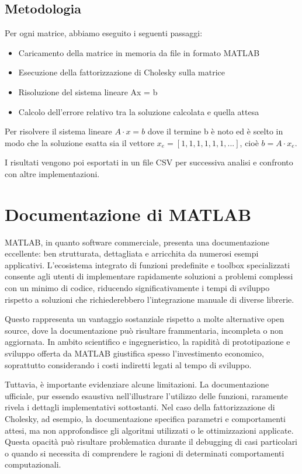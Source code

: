 \subsection{Metodologia}

Per ogni matrice, abbiamo eseguito i seguenti passaggi:

\begin{itemize}
    \item Caricamento della matrice in memoria da file in formato MATLAB
    \item Esecuzione della fattorizzazione di Cholesky sulla matrice
    \item Risoluzione del sistema lineare Ax = b
    \item Calcolo dell'errore relativo tra la soluzione calcolata e quella attesa
\end{itemize}

Per risolvere il sistema lineare $A \cdot x = b$ dove il termine b è noto ed è scelto in modo che la soluzione esatta
sia il vettore $x_e = [1, 1, 1, 1, 1, 1, ...]$, cioè $b = A \cdot x_e$.

I risultati vengono poi esportati in un file CSV per successiva analisi e confronto con altre implementazioni.

\section{Documentazione di MATLAB}

MATLAB, in quanto software commerciale, presenta una documentazione eccellente: ben strutturata, dettagliata e arricchita da numerosi 
esempi applicativi. L'ecosistema integrato di funzioni predefinite e toolbox specializzati consente agli utenti di implementare 
rapidamente soluzioni a problemi complessi con un minimo di codice, riducendo significativamente i tempi di sviluppo rispetto a 
soluzioni che richiederebbero l'integrazione manuale di diverse librerie.

Questo rappresenta un vantaggio sostanziale rispetto a molte alternative open source, dove la documentazione può risultare frammentaria, 
incompleta o non aggiornata. In ambito scientifico e ingegneristico, la rapidità di prototipazione e sviluppo offerta da MATLAB giustifica 
spesso l'investimento economico, soprattutto considerando i costi indiretti legati al tempo di sviluppo.

Tuttavia, è importante evidenziare alcune limitazioni. La documentazione ufficiale, pur essendo esaustiva nell'illustrare l'utilizzo delle 
funzioni, raramente rivela i dettagli implementativi sottostanti. Nel caso della fattorizzazione di Cholesky, ad esempio, 
la documentazione specifica parametri e comportamenti attesi, ma non approfondisce gli algoritmi utilizzati o le ottimizzazioni applicate.
Questa opacità può risultare problematica durante il debugging di casi particolari o quando si necessita di comprendere le ragioni di 
determinati comportamenti computazionali.

